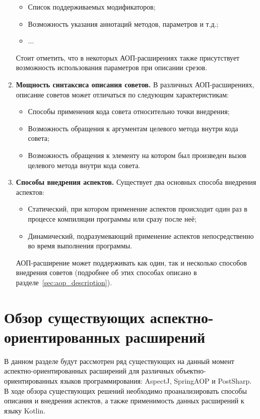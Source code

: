 \begin{enumerate}
\begin{itemize}
      \item Список поддерживаемых модификаторов;
      \item Возможность указания аннотаций методов, параметров и т.д.;
      \item ...
  \end{itemize}
  Стоит отметить, что в некоторых АОП-расширениях также присутствует возможность использования параметров при описании срезов.
\item \textbf{Мощность синтаксиса описания советов.}
  В различных АОП-расширениях, описание советов может отличаться по следующим характеристикам:
  \begin{itemize}
      \item Способы применения кода совета относительно точки внедрения;
      \item Возможность обращения к аргументам целевого метода внутри кода совета;
      \item Возможность обращения к элементу на котором был произведен вызов целевого метода внутри кода совета.
  \end{itemize}
\item \textbf{Способы внедрения аспектов.}
  Существует два основных способа внедрения аспектов:
  \begin{itemize}
      \item Статический, при котором применение аспектов происходит один раз в процессе компиляции программы или сразу после неё;
      \item Динамический, подразумевающий применение аспектов непосредственно во время выполнения программы.
  \end{itemize}
  АОП-расширение может поддерживать как один, так и несколько способов внедрения
  советов (подробнее об этих способах описано в разделе~\ref{sec:aop_description}).
\end{enumerate}
\section{Обзор существующих аспектно-ориентированных расширений}
\label{sec:aop_extension_overwiev}
В данном разделе будут рассмотрен ряд существующих на данный момент
аспектно-ориентированных расширений для различных объектно-ориентированных
языков программирования: AspectJ, SpringAOP и PostSharp.
В ходе обзора существующих решений необходимо проанализировать способы описания и внедрения аспектов, а также применимость данных расширений к языку Kotlin.
